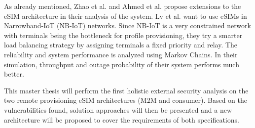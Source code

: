 As already mentioned, Zhao et al. \parencite{Zhao:SecureSIM} and Ahmed et al. \parencite{Ahmed:TransparancyProfile} propose extensions to the eSIM architecture in their analysis of the system. Lv et al. \parencite{Lv:NbIoTeSIM} want to use eSIMs in Narrowband-IoT (NB-IoT) networks. Since NB-IoT is a very constrained network with terminals being the bottleneck for profile provisioning, they try a smarter load balancing strategy by assigning terminals a fixed priority and relay. The reliability and system performance is analyzed using Markov Chains. In their simulation, throughput and outage probability of their system performs much better.

This master thesis will perform the first holistic external security analysis on the two remote provisioning eSIM architectures (M2M and consumer). Based on the vulnerabilities found, solution approaches will then be presented and a new architecture will be proposed to cover the requirements of both specifications.